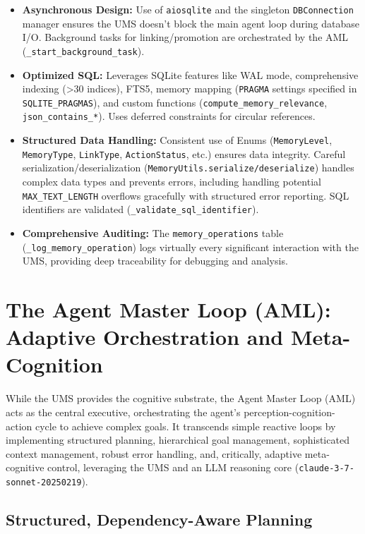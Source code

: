 \documentclass[12pt,a4paper]{article}
\newcommand{\code}[1]{\nolinkurl{#1}}
\begin{document}
\begin{itemize}
    \item \textbf{Asynchronous Design:} Use of \code{aiosqlite} and the singleton \code{DBConnection} manager ensures the UMS doesn't block the main agent loop during database I/O. Background tasks for linking/promotion are orchestrated by the AML (\code{\_start\_background\_task}).

    \item \textbf{Optimized SQL:} Leverages SQLite features like WAL mode, comprehensive indexing (>30 indices), FTS5, memory mapping (\code{PRAGMA} settings specified in \code{SQLITE\_PRAGMAS}), and custom functions (\code{compute\_memory\_relevance}, \code{json\_contains\_*}). Uses deferred constraints for circular references.

    \item \textbf{Structured Data Handling:} Consistent use of Enums (\code{MemoryLevel}, \code{MemoryType}, \code{LinkType}, \code{ActionStatus}, etc.) ensures data integrity. Careful serialization/deserialization (\code{MemoryUtils.serialize/deserialize}) handles complex data types and prevents errors, including handling potential \code{MAX\_TEXT\_LENGTH} overflows gracefully with structured error reporting. SQL identifiers are validated (\code{\_validate\_sql\_identifier}).

    \item \textbf{Comprehensive Auditing:} The \code{memory\_operations} table (\code{\_log\_memory\_operation}) logs virtually every significant interaction with the UMS, providing deep traceability for debugging and analysis.
\end{itemize}

\section{The Agent Master Loop (AML): Adaptive Orchestration and Meta-Cognition}

While the UMS provides the cognitive substrate, the Agent Master Loop (AML) acts as the central executive, orchestrating the agent's perception-cognition-action cycle to achieve complex goals. It transcends simple reactive loops by implementing structured planning, hierarchical goal management, sophisticated context management, robust error handling, and, critically, adaptive meta-cognitive control, leveraging the UMS and an LLM reasoning core (\code{claude-3-7-sonnet-20250219}).

\subsection{Structured, Dependency-Aware Planning}
\end{document}
